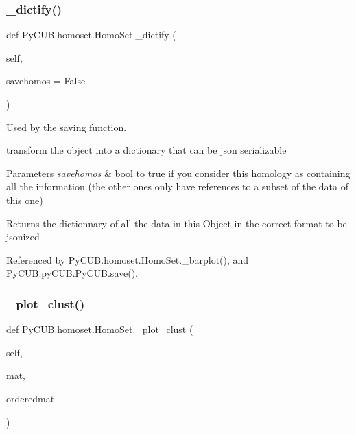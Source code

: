 \subsubsection{\texorpdfstring{\+\_\+dictify()}{\_dictify()}}
{\footnotesize\ttfamily def Py\+C\+U\+B.\+homoset.\+Homo\+Set.\+\_\+dictify (\begin{DoxyParamCaption}\item[{}]{self,  }\item[{}]{savehomos = {\ttfamily False} }\end{DoxyParamCaption})\hspace{0.3cm}{\ttfamily [private]}}



Used by the saving function. 

transform the object into a dictionary that can be json serializable


\begin{DoxyParams}{Parameters}
{\em savehomos} & bool to true if you consider this homology as containing all the information (the other ones only have references to a subset of the data of this one)\\
\hline
\end{DoxyParams}
\begin{DoxyReturn}{Returns}
the dictionnary of all the data in this Object in the correct format to be jsonized 
\end{DoxyReturn}


Referenced by Py\+C\+U\+B.\+homoset.\+Homo\+Set.\+\_\+barplot(), and Py\+C\+U\+B.\+py\+C\+U\+B.\+Py\+C\+U\+B.\+save().

\mbox{\label{class_py_c_u_b_1_1homoset_1_1_homo_set_a795cfd3187026bde3c065aab9fe09642}} 
\subsubsection{\texorpdfstring{\+\_\+plot\+\_\+clust()}{\_plot\_clust()}}
{\footnotesize\ttfamily def Py\+C\+U\+B.\+homoset.\+Homo\+Set.\+\_\+plot\+\_\+clust (\begin{DoxyParamCaption}\item[{}]{self,  }\item[{}]{mat,  }\item[{}]{orderedmat }\end{DoxyParamCaption})\hspace{0.3cm}{\ttfamily [private]}}



